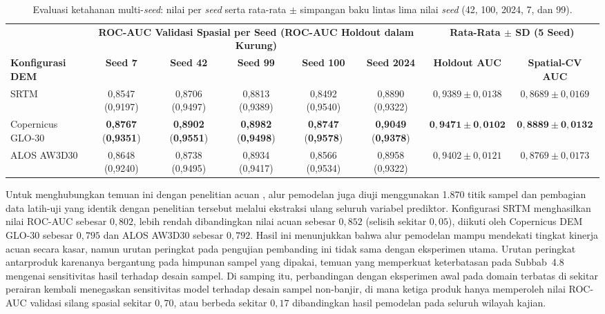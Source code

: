 \documentclass[12pt,a4paper]{article}
\newenvironment{adjustbox}[1]{%
  \begin{lrbox}{\adjboxtemp}%
}{%
  \end{lrbox}%
  \ifdim\wd\adjboxtemp>\textwidth
    \resizebox{\textwidth}{!}{\usebox{\adjboxtemp}}%
  \else
    \usebox{\adjboxtemp}%
  \fi
}
\begin{document}
\begin{table}[!htbp]
\small
\centering
\caption[Evaluasi ketahanan multi-seed lintas lima nilai seed]{Evaluasi ketahanan multi-\textit{seed}: nilai per \textit{seed} serta rata-rata $\pm$ simpangan baku lintas lima nilai \textit{seed} (42, 100, 2024, 7, dan 99).}
\label{tab:multiseed}
\begin{adjustbox}{max width=\textwidth}
\begin{tabular}{l ccccc c c}
\toprule
& \multicolumn{5}{c}{\textbf{ROC-AUC Validasi Spasial per Seed (ROC-AUC Holdout dalam Kurung)}} & \multicolumn{2}{c}{\textbf{Rata-Rata $\pm$ SD (5 Seed)}} \\
\cmidrule(lr){2-6} \cmidrule(lr){7-8}
\textbf{Konfigurasi DEM} & \textbf{Seed 7} & \textbf{Seed 42} & \textbf{Seed 99} & \textbf{Seed 100} & \textbf{Seed 2024} & \textbf{Holdout AUC} & \textbf{Spatial-CV AUC} \\
\midrule
SRTM & 0,8547 (0,9197) & 0,8706 (0,9497) & 0,8813 (0,9389) & 0,8492 (0,9540) & 0,8890 (0,9322) & $0{,}9389 \pm 0{,}0138$ & $0{,}8689 \pm 0{,}0169$ \\
Copernicus GLO-30 & \textbf{0,8767} (\textbf{0,9351}) & \textbf{0,8902} (\textbf{0,9551}) & \textbf{0,8982} (\textbf{0,9498}) & \textbf{0,8747} (\textbf{0,9578}) & \textbf{0,9049} (\textbf{0,9378}) & $\mathbf{0{,}9471 \pm 0{,}0102}$ & $\mathbf{0{,}8889 \pm 0{,}0132}$ \\
ALOS AW3D30 & 0,8648 (0,9240) & 0,8738 (0,9495) & 0,8934 (0,9417) & 0,8566 (0,9534) & 0,8958 (0,9322) & $0{,}9402 \pm 0{,}0121$ & $0{,}8769 \pm 0{,}0173$ \\
\bottomrule
\end{tabular}
\end{adjustbox}
\end{table}

Untuk menghubungkan temuan ini dengan penelitian acuan \citep{hakim2026}, alur
pemodelan juga diuji menggunakan 1.870 titik sampel dan pembagian data
latih-uji yang identik dengan penelitian tersebut melalui ekstraksi ulang
seluruh variabel prediktor. Konfigurasi SRTM menghasilkan nilai ROC-AUC
sebesar $0{,}802$, lebih rendah dibandingkan nilai acuan sebesar $0{,}852$
(selisih sekitar $0{,}05$), diikuti oleh Copernicus DEM GLO-30 sebesar
$0{,}795$ dan ALOS AW3D30 sebesar $0{,}792$. Hasil ini menunjukkan bahwa alur
pemodelan mampu mendekati tingkat kinerja acuan secara kasar, namun urutan
peringkat pada pengujian pembanding ini tidak sama dengan eksperimen utama.
Urutan peringkat antarproduk karenanya bergantung pada himpunan sampel yang
dipakai, temuan yang memperkuat keterbatasan pada Subbab~4.8 mengenai
sensitivitas hasil terhadap desain sampel. Di samping itu, perbandingan
dengan eksperimen awal pada domain terbatas di sekitar perairan kembali
menegaskan sensitivitas model terhadap desain sampel
non-banjir, di mana ketiga produk hanya memperoleh nilai ROC-AUC validasi
silang spasial sekitar $0{,}70$, atau berbeda sekitar $0{,}17$ dibandingkan
hasil pemodelan pada seluruh wilayah kajian.
\end{document}
